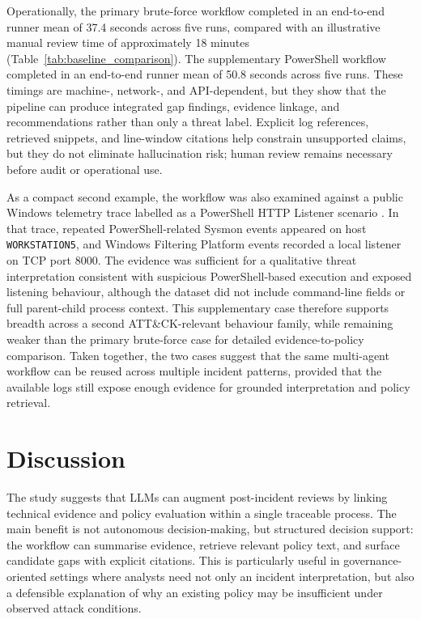 \documentclass[conference]{IEEEtran}
\begin{document}
Operationally, the primary brute-force workflow completed in an end-to-end runner mean of 37.4 seconds across five runs, compared with an illustrative manual review time of approximately 18 minutes (Table~\ref{tab:baseline_comparison}). The supplementary PowerShell workflow completed in an end-to-end runner mean of 50.8 seconds across five runs. These timings are machine-, network-, and API-dependent, but they show that the pipeline can produce integrated gap findings, evidence linkage, and recommendations rather than only a threat label. Explicit log references, retrieved snippets, and line-window citations help constrain unsupported claims, but they do not eliminate hallucination risk; human review remains necessary before audit or operational use.

As a compact second example, the workflow was also examined against a public Windows telemetry trace labelled as a PowerShell HTTP Listener scenario \cite{Rodriguez2020PowerShellHTTPListener}. In that trace, repeated PowerShell-related Sysmon events appeared on host \texttt{WORKSTATION5}, and Windows Filtering Platform events recorded a local listener on TCP port 8000. The evidence was sufficient for a qualitative threat interpretation consistent with suspicious PowerShell-based execution and exposed listening behaviour, although the dataset did not include command-line fields or full parent-child process context. This supplementary case therefore supports breadth across a second ATT\&CK-relevant behaviour family, while remaining weaker than the primary brute-force case for detailed evidence-to-policy comparison. Taken together, the two cases suggest that the same multi-agent workflow can be reused across multiple incident patterns, provided that the available logs still expose enough evidence for grounded interpretation and policy retrieval.


\section{Discussion}
The study suggests that LLMs can augment post-incident reviews by linking technical evidence and policy evaluation within a single traceable process. The main benefit is not autonomous decision-making, but structured decision support: the workflow can summarise evidence, retrieve relevant policy text, and surface candidate gaps with explicit citations. This is particularly useful in governance-oriented settings where analysts need not only an incident interpretation, but also a defensible explanation of why an existing policy may be insufficient under observed attack conditions.
\end{document}
